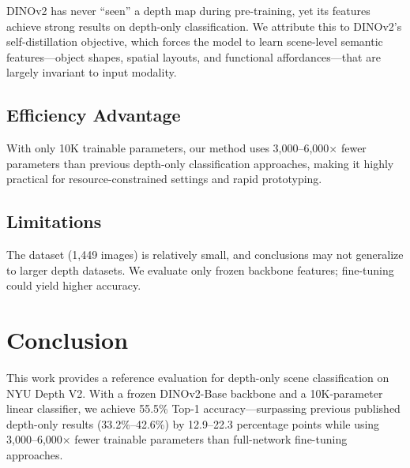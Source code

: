\documentclass[conference, a4paper]{IEEEtran}
\begin{document}
DINOv2 has never ``seen'' a depth map during pre-training, yet its features achieve
strong results on depth-only classification. We attribute this to DINOv2's
self-distillation objective, which forces the model to learn scene-level semantic
features---object shapes, spatial layouts, and functional affordances---that are
largely invariant to input modality.

\subsection{Efficiency Advantage}

With only 10K trainable parameters, our method uses 3,000--6,000$\times$ fewer
parameters than previous depth-only classification approaches, making it highly
practical for resource-constrained settings and rapid prototyping.

\subsection{Limitations}

The dataset (1,449 images) is relatively small, and conclusions may not generalize to
larger depth datasets. We evaluate only frozen backbone features; fine-tuning could
yield higher accuracy.

\section{Conclusion}

This work provides a reference evaluation for depth-only scene
classification on NYU Depth V2. With a frozen DINOv2-Base backbone and a 10K-parameter
linear classifier, we achieve 55.5\% Top-1 accuracy---surpassing previous published
depth-only results (33.2\%--42.6\%) by 12.9--22.3 percentage points while using
3,000--6,000$\times$ fewer trainable parameters than full-network fine-tuning approaches.
\end{document}
